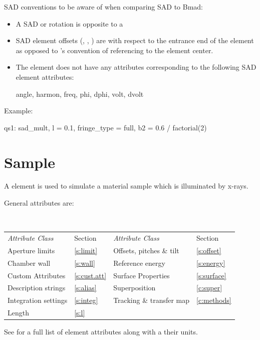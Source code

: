{SAD conventions to be aware of when comparing SAD to Bmad:
\begin{itemize}
\item
A SAD  or  rotation is opposite to a \bmad {}
\item
SAD element offsets (, , ) are with respect to the entrance end of the element
as opposed to \bmad's convention of referencing to the element center.
\item
  The \bmad {} element does not have any attributes corresponding to the following
SAD  element attributes:
\vspace{0.5ex}
\begin{example}
  angle, harmon, freq, phi, dphi, volt, dvolt
\end{example}
\end{itemize}

Example:
\begin{example}
  qs1: sad_mult, l = 0.1, fringe_type = full, b2 = 0.6 / factorial(2)
\end{example}

\newpage

\section{Sample}
\label{s:sample}

A  element is used to simulate a material sample which is illuminated by x-rays.

General  attributes are:
\begin{center}
\tt
\begin{tabular}{llll} \toprule
  {\sl Attribute Class}      & Section           & {\sl Attribute Class}      & Section         \\
  Aperture limits            & \ref{s:limit}     & Offsets, pitches \& tilt   & \ref{s:offset}  \\ \midrule
  Chamber wall               & \ref{s:wall}      & Reference energy           & \ref{s:energy}  \\ 
  Custom Attributes          & \ref{s:cust.att}  & Surface Properties         & \ref{s:surface} \\
  Description strings        & \ref{s:alias}     & Superposition              & \ref{c:super}   \\
  Integration settings       & \ref{s:integ}     & Tracking \& transfer map   & \ref{c:methods} \\
  Length                     & \ref{s:l}         &                            &                 \\
  \bottomrule
\end{tabular}
\end{center}
\toffset
See  for a full list of element attributes along with a their units.

}
